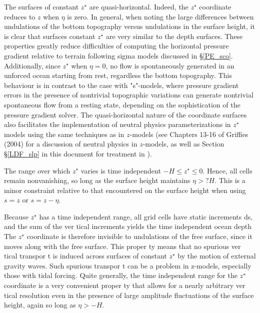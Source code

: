\documentclass[NEMO_book]{subfiles}
\begin{document}
The surfaces of constant $z^\star$ are quasi-horizontal. Indeed, the $z^\star$ coordinate reduces to $z$ when $\eta$ is zero. In general, when noting the large differences between 
undulations of the bottom topography versus undulations in the surface height, it 
is clear that surfaces constant $z^\star$ are very similar to the depth surfaces. These properties greatly reduce difficulties of computing the horizontal pressure gradient relative to terrain following sigma models discussed in \S\ref{PE_sco}. 
Additionally, since $z^\star$ when $\eta = 0$, no flow is spontaneously generated in an 
unforced ocean starting from rest, regardless the bottom topography. This behaviour is in contrast to the case with "s"-models, where pressure gradient errors in 
the presence of nontrivial topographic variations can generate nontrivial spontaneous flow from a resting state, depending on the sophistication of the pressure 
gradient solver. The quasi-horizontal nature of the coordinate surfaces also facilitates the implementation of neutral physics parameterizations in $z^\star$ models using 
the same techniques as in $z$-models (see Chapters 13-16 of Griffies (2004) for a 
discussion of neutral physics in $z$-models, as well as Section \S\ref{LDF_slp} 
in this document for treatment in \NEMO). 

The range over which $z^\star$ varies is time independent $-H \leq z^\star \leq 0$. Hence, all 
cells remain nonvanishing, so long as the surface height maintains $\eta > ?H$. This 
is a minor constraint relative to that encountered on the surface height when using 
$s = z$ or $s = z - \eta$. 

Because $z^\star$ has a time independent range, all grid cells have static increments 
ds, and the sum of the ver tical increments yields the time independent ocean 
depth %
The $z^\star$ coordinate is therefore invisible to undulations of the 
free surface, since it moves along with the free surface. This proper ty means that 
no spurious ver tical transpor t is induced across surfaces of constant $z^\star$ by the 
motion of external gravity waves. Such spurious transpor t can be a problem in 
z-models, especially those with tidal forcing. Quite generally, the time independent 
range for the $z^\star$ coordinate is a very convenient proper ty that allows for a nearly 
arbitrary ver tical resolution even in the presence of large amplitude fluctuations of 
the surface height, again so long as $\eta > -H$. 



\end{document}
